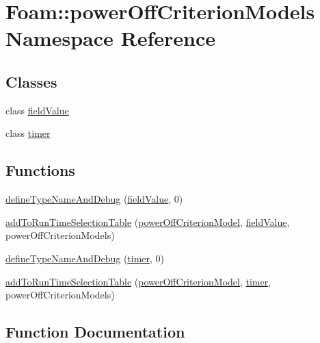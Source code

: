 \hypertarget{namespaceFoam_1_1powerOffCriterionModels}{}\section{Foam\+:\+:power\+Off\+Criterion\+Models Namespace Reference}
\label{namespaceFoam_1_1powerOffCriterionModels}
\subsection*{Classes}
\begin{DoxyCompactItemize}
\item 
class \hyperlink{classFoam_1_1powerOffCriterionModels_1_1fieldValue}{field\+Value}
\item 
class \hyperlink{classFoam_1_1powerOffCriterionModels_1_1timer}{timer}
\end{DoxyCompactItemize}
\subsection*{Functions}
\begin{DoxyCompactItemize}
\item 
\hyperlink{namespaceFoam_1_1powerOffCriterionModels_aa78a5223ac23a27ee069f291651913e1}{define\+Type\+Name\+And\+Debug} (\hyperlink{classFoam_1_1powerOffCriterionModels_1_1fieldValue}{field\+Value}, 0)
\item 
\hyperlink{namespaceFoam_1_1powerOffCriterionModels_ac3a870bb23695c6fff03c1111e46b44f}{add\+To\+Run\+Time\+Selection\+Table} (\hyperlink{classFoam_1_1powerOffCriterionModel}{power\+Off\+Criterion\+Model}, \hyperlink{classFoam_1_1powerOffCriterionModels_1_1fieldValue}{field\+Value}, power\+Off\+Criterion\+Models)
\item 
\hyperlink{namespaceFoam_1_1powerOffCriterionModels_abfafa4b0e8070db6deea25e15b53927b}{define\+Type\+Name\+And\+Debug} (\hyperlink{classFoam_1_1powerOffCriterionModels_1_1timer}{timer}, 0)
\item 
\hyperlink{namespaceFoam_1_1powerOffCriterionModels_ac71fbbd475c6b9c553966de9b72e8f1c}{add\+To\+Run\+Time\+Selection\+Table} (\hyperlink{classFoam_1_1powerOffCriterionModel}{power\+Off\+Criterion\+Model}, \hyperlink{classFoam_1_1powerOffCriterionModels_1_1timer}{timer}, power\+Off\+Criterion\+Models)
\end{DoxyCompactItemize}


\subsection{Function Documentation}
\mbox{\label{namespaceFoam_1_1powerOffCriterionModels_aa78a5223ac23a27ee069f291651913e1}} 
